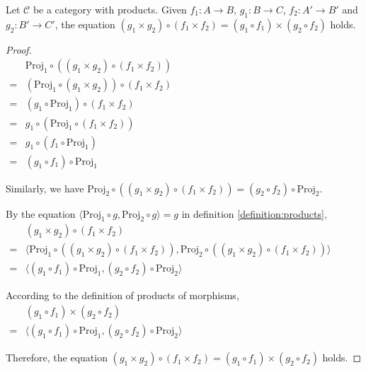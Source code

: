 \begin{proposition}
\label{proposition:pro_of_mor}
Let $ \mathcal{C} $ be a category with products. Given $ f_1 : A \to B $, $ g_1 : B \to C $, $ f_2 : A' \to B' $ and $ g_2 : B' \to C' $, the equation $ ( g_1 \times g_2 ) \circ ( f_1 \times f_2 ) = ( g_1 \circ f_1 ) \times ( g_2 \circ f_2 ) $ holds.
\end{proposition}
\begin{proof}
\mbox\\
\\
$
\begin{array}{ll}
  & \text{Proj}_1 \circ ( ( g_1 \times g_2 ) \circ ( f_1 \times f_2 ) )\\
= & ( \text{Proj}_1 \circ ( g_1 \times g_2 ) ) \circ ( f_1 \times f_2 )\\
= & ( g_1 \circ \text{Proj}_1 ) \circ ( f_1 \times f_2 )\\
= & g_1 \circ ( \text{Proj}_1 \circ ( f_1 \times f_2 ) )\\
= & g_1 \circ ( f_1 \circ \text{Proj}_1)\\
= & ( g_1 \circ f_1 ) \circ \text{Proj}_1
\end{array}
$

Similarly, we have $ \text{Proj}_2 \circ ( ( g_1 \times g_2 ) \circ ( f_1 \times f_2 ) ) = ( g_2 \circ f_2 ) \circ \text{Proj}_2 $.

By the equation $ \langle \text{Proj}_1 \circ g , \text{Proj}_2 \circ g \rangle = g $ in definition \ref{definition:products},\\
$
\begin{array}{ll}
  & ( g_1 \times g_2 ) \circ ( f_1 \times f_2 )\\
= & \langle \text{Proj}_1 \circ ( ( g_1 \times g_2 ) \circ ( f_1 \times f_2 ) ) , \text{Proj}_2 \circ ( ( g_1 \times g_2 ) \circ ( f_1 \times f_2 ) ) \rangle \\
= & \langle ( g_1 \circ f_1 ) \circ \text{Proj}_1 , ( g_2 \circ f_2 ) \circ \text{Proj}_2 \rangle
\end{array}
$

According to the definition of products of morphisms,\\
$
\begin{array}{ll}
  & ( g_1 \circ f_1 ) \times ( g_2 \circ f_2 )\\
= & \langle ( g_1 \circ f_1 ) \circ \text{Proj}_1 , ( g_2 \circ f_2 ) \circ \text{Proj}_2 \rangle
\end{array}
$

Therefore, the equation $ ( g_1 \times g_2 ) \circ ( f_1 \times f_2 ) = ( g_1 \circ f_1 ) \times ( g_2 \circ f_2 ) $ holds.
\end{proof}

